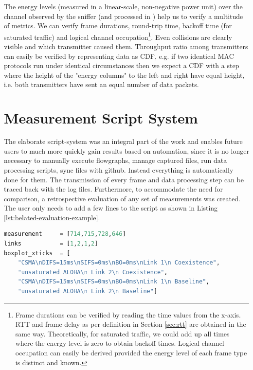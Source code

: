The energy levels (measured in a linear-scale, non-negative power unit) over the channel observed by the sniffer (and processed in ) help us to verify a multitude of metrics. We can verify frame durations, round-trip time, backoff time (for saturated traffic) and logical channel occupation\footnote{Frame durations can be verified by reading the time values from the x-axis. RTT and frame delay as per definition in Section \ref{sec:rtt} are obtained in the same way. Theoretically, for saturated traffic, we could add up all times where the energy level is zero to obtain backoff times. Logical channel occupation can easily be derived provided the energy level of each frame type is distinct and known.}. Even collisions are clearly visible and which transmitter caused them. Throughput ratio among transmitters can easily be verified by representing data as CDF, e.g. if two identical MAC protocols run under identical circumstances then we expect a CDF with a step where the height of the "energy columns" to the left and right have equal height, i.e. both transmitters have sent an equal number of data packets.

\section{Measurement Script System}
\label{sec:script-system}

The elaborate script-system was an integral part of the work and enables future users to much more quickly gain results based on automation, since it is no longer necessary to manually execute flowgraphs, manage captured files, run data processing scripts, sync files with github. Instead everything is automatically done for them. The transmission of every frame and data processing step can be traced back with the log files. Furthermore, to accommodate the need for comparison, a retrospective evaluation of any set of measurements  was created. The user only needs to add a few lines to the script as shown in Listing \ref{lst:belated-evaluation-example}.
  
\begin{lstlisting}[language=Python,caption={[{Retrospective evaluation of measurements}](Evaluation of measurements with \code{belated\_evaluation.py}. In \code{links} we denote the link we used in the corresponding measurement (compare Figure \ref{fig:measurement-setup}).)},label=lst:belated-evaluation-example]
measurement     = [714,715,728,646]
links           = [1,2,1,2]
boxplot_xticks  = [
	"CSMA\nDIFS=15ms\nSIFS=0ms\nBO=0ms\nLink 1\n Coexistence",
    "unsaturated ALOHA\n Link 2\n Coexistence",
    "CSMA\nDIFS=15ms\nSIFS=0ms\nBO=0ms\nLink 1\n Baseline",
    "unsaturated ALOHA\n Link 2\n Baseline"]
\end{lstlisting}

